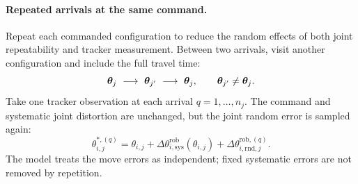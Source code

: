 \documentclass[../main.tex]{subfiles}
\begin{document}
\paragraph{Repeated arrivals at the same command.}
Repeat each commanded configuration to reduce the random effects of both joint repeatability and tracker measurement. Between two arrivals, visit another configuration and include the full travel time:
\begin{equation*}
\vct{\theta}_j\ \longrightarrow\ \vct{\theta}_{j'}\ \longrightarrow\ \vct{\theta}_j,
\qquad \vct{\theta}_{j'}\ne\vct{\theta}_j.
\end{equation*}
Take one tracker observation at each arrival $q=1,\ldots,n_j$. The command and systematic joint distortion are unchanged, but the joint random error is sampled again:
\begin{equation*}
\theta_{i,j}^{*,(q)}=\theta_{i,j}
+\Delta\theta^{\mathrm{rob}}_{i,\mathrm{sys}}(\theta_{i,j})
+\Delta\theta^{\mathrm{rob},(q)}_{i,\mathrm{rnd},j}.
\end{equation*}
The model treats the move errors as independent; fixed systematic errors are not removed by repetition.
\end{document}

